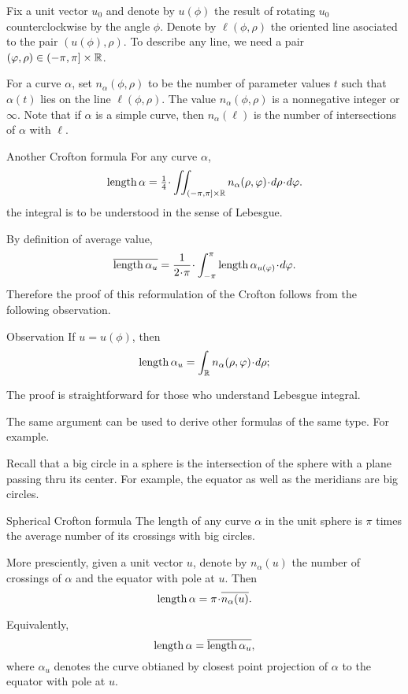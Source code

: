 Fix a unit vector $u_0$ and denote by $u(\phi)$ the result of rotating $u_0$ counterclockwise by the angle $\phi $. %
Denote by $\ell(\phi,\rho)$ the oriented line asociated to the pair $(u(\phi),\rho)$.
To describe any line, we need a pair $(\varphi,\rho)\in (-\pi,\pi]\times \mathbb{R}$.

For a curve $\alpha$, set $n_\alpha(\phi,\rho)$ to be the number of parameter values $t$ such that $\alpha(t)$ lies on the line $\ell(\phi,\rho)$. 
The value $n_\alpha(\phi,\rho)$ is a nonnegative integer or $\infty$.
Note that if $\alpha$ is a simple curve, then $n_\alpha(\ell)$ is the number of intersections of $\alpha$ with $\ell$.


\begin{thm}{Another Crofton formula}
For any curve $\alpha$,
\[\length\alpha=\tfrac14\cdot\iint_{(-\pi,\pi]\times \RR} n_\alpha(\rho,\phi)\cdot d\rho\cdot d\phi.\]
the integral is to be understood in the sense of Lebesgue.
\end{thm}

By definition of average value,
\[\overline{\length\alpha_u}
=
\frac1{2\cdot\pi}\cdot\int_{-\pi}^\pi \length\alpha_{u(\phi)}\cdot d\phi.\]
Therefore the proof of this reformulation of the Crofton follows from the following observation.

\begin{thm}{Observation}
If $u=u(\phi)$, then 
\[\length\alpha_u=\int_\RR n_\alpha(\rho,\phi)\cdot d\rho;\]

\end{thm}

The proof is straightforward for those who understand Lebesgue integral.

The same argument can be used to derive other formulas of the same type.
For example.

Recall that a big circle in a sphere is the intersection of the sphere with a plane passing thru its center.
For example, the equator as well as the meridians are big circles.

\begin{thm}{Spherical Crofton formula}\label{thm:crofton-sphere}
The length of any curve $\alpha$ in the unit sphere is $\pi$ times the average number of its crossings with big circles.

More presciently, given a unit vector $u$, denote by $n_\alpha(u)$ the number of crossings of $\alpha$ and the equator with pole at $u$.
Then 
\[\length\alpha=\pi\cdot\overline{n_\alpha(u)}.\]

Equivalently,
\[\mathop{\rm length}\nolimits\alpha=\overline{\mathop{\rm length}\nolimits\alpha_u},\]
where $\alpha_u$ denotes the curve obtianed by closest point projection of $\alpha$ to the equator with pole at $u$.
\end{thm}


